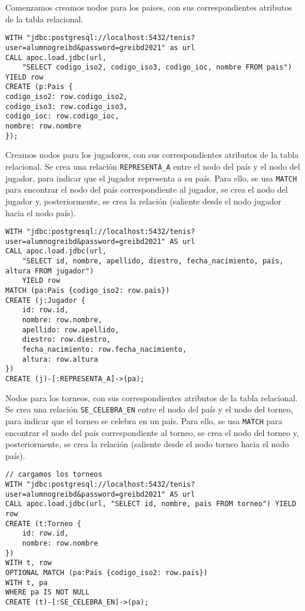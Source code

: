 Comenzamos creamos nodos para los paises, con sus correspondientes atributos de la tabla relacional. 

\begin{verbatim}
WITH "jdbc:postgresql://localhost:5432/tenis?user=alumnogreibd&password=greibd2021" as url
CALL apoc.load.jdbc(url, 
    "SELECT codigo_iso2, codigo_iso3, codigo_ioc, nombre FROM pais") YIELD row
CREATE (p:Pais {
codigo_iso2: row.codigo_iso2,
codigo_iso3: row.codigo_iso3,
codigo_ioc: row.codigo_ioc,
nombre: row.nombre
});
\end{verbatim}


Creamos nodos para los jugadores, con sus correspondientes atributos de la tabla relacional. Se crea una relación \texttt{REPRESENTA\_A} entre el nodo del país y el nodo del jugador, para indicar que el jugador representa a su país. Para ello, se usa \texttt{MATCH} para encontrar el nodo del país correspondiente al jugador, se crea el nodo del jugador y, posteriormente, se crea la relación (saliente desde el nodo jugador hacia el nodo país).

\begin{verbatim}
WITH "jdbc:postgresql://localhost:5432/tenis?user=alumnogreibd&password=greibd2021" AS url
CALL apoc.load.jdbc(url, 
    "SELECT id, nombre, apellido, diestro, fecha_nacimiento, pais, altura FROM jugador") 
    YIELD row
MATCH (pa:Pais {codigo_iso2: row.pais})
CREATE (j:Jugador {
    id: row.id,
    nombre: row.nombre,
    apellido: row.apellido,
    diestro: row.diestro,
    fecha_nacimiento: row.fecha_nacimiento,
    altura: row.altura
})
CREATE (j)-[:REPRESENTA_A]->(pa);
\end{verbatim}

Nodos para los torneos, con sus correspondientes atributos de la tabla relacional. Se crea una relación \texttt{SE\_CELEBRA\_EN} entre el nodo del país y el nodo del torneo, para indicar que el torneo se celebra en un país. Para ello, se usa \texttt{MATCH} para encontrar el nodo del país correspondiente al torneo, se crea el nodo del torneo y, posteriormente, se crea la relación (saliente desde el nodo torneo hacia el nodo país).

\begin{verbatim}
// cargamos los torneos
WITH "jdbc:postgresql://localhost:5432/tenis?user=alumnogreibd&password=greibd2021" AS url
CALL apoc.load.jdbc(url, "SELECT id, nombre, pais FROM torneo") YIELD row
CREATE (t:Torneo {
    id: row.id,
    nombre: row.nombre
})
WITH t, row
OPTIONAL MATCH (pa:Pais {codigo_iso2: row.pais})
WITH t, pa
WHERE pa IS NOT NULL
CREATE (t)-[:SE_CELEBRA_EN]->(pa);
\end{verbatim}

